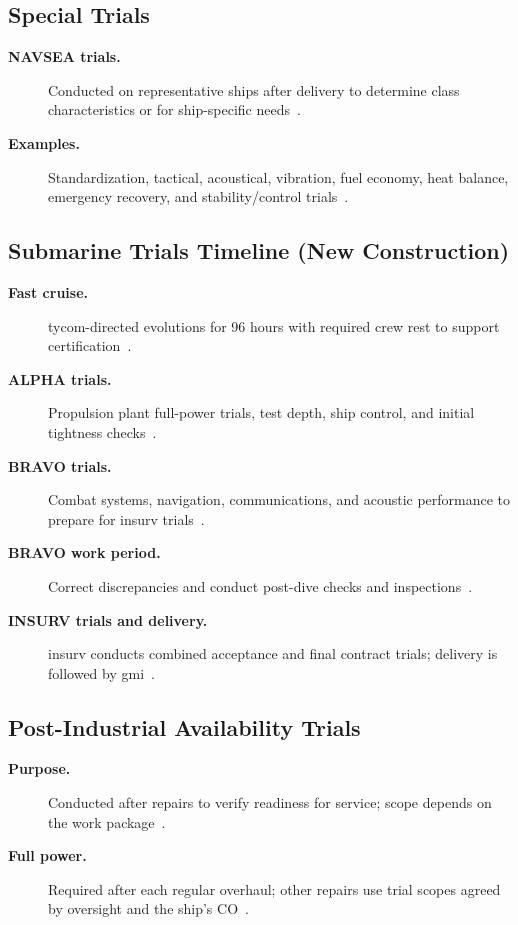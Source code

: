 \documentclass[../main.tex]{subfiles}
\begin{document}
\subsection{Special Trials}
\begin{description}
  \item[\textbf{NAVSEA trials.}] Conducted on representative ships after delivery to determine class characteristics or for ship-specific needs~\autocite{edo-3-5-7-ship-trials-2025}.
  \item[\textbf{Examples.}] Standardization, tactical, acoustical, vibration, fuel economy, heat balance, emergency recovery, and stability/control trials~\autocite{edo-3-5-7-ship-trials-2025}.
\end{description}

\subsection{Submarine Trials Timeline (New Construction)}
\begin{description}
  \item[\textbf{Fast cruise.}] \ac{tycom}-directed evolutions for 96 hours with required crew rest to support certification~\autocite{edo-3-5-7-ship-trials-2025}.
  \item[\textbf{ALPHA trials.}] Propulsion plant full-power trials, test depth, ship control, and initial tightness checks~\autocite{edo-3-5-7-ship-trials-2025}.
  \item[\textbf{BRAVO trials.}] Combat systems, navigation, communications, and acoustic performance to prepare for \ac{insurv} trials~\autocite{edo-3-5-7-ship-trials-2025}.
  \item[\textbf{BRAVO work period.}] Correct discrepancies and conduct post-dive checks and inspections~\autocite{edo-3-5-7-ship-trials-2025}.
  \item[\textbf{INSURV trials and delivery.}] \ac{insurv} conducts combined acceptance and final contract trials; delivery is followed by \ac{gmi}~\autocite{edo-3-5-7-ship-trials-2025}.
\end{description}

\subsection{Post-Industrial Availability Trials}
\begin{description}
  \item[\textbf{Purpose.}] Conducted after repairs to verify readiness for service; scope depends on the work package~\autocite{edo-3-5-7-ship-trials-2025}.
  \item[\textbf{Full power.}] Required after each regular overhaul; other repairs use trial scopes agreed by oversight and the ship's CO~\autocite{edo-3-5-7-ship-trials-2025}.
\end{description}
\end{document}
